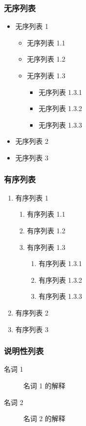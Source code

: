 \documentclass[
    10pt,
    pdf,
    UTF8,
    aspectratio=169
]{ctexbeamer}
\begin{document}
\begin{frame}
    \frametitle{无序列表}
    \begin{itemize}
        \item 无序列表 1
        \begin{itemize}
            \item 无序列表 1.1
            \item 无序列表 1.2
            \item 无序列表 1.3
            \begin{itemize}
                \item 无序列表 1.3.1
                \item 无序列表 1.3.2
                \item 无序列表 1.3.3
            \end{itemize}
        \end{itemize}
        \item 无序列表 2
        \item 无序列表 3
    \end{itemize}
\end{frame}
\begin{frame}
    \frametitle{有序列表}
    \begin{enumerate}
        \item 有序列表 1
        \begin{enumerate}
            \item 有序列表 1.1
            \item 有序列表 1.2
            \item 有序列表 1.3
            \begin{enumerate}
                \item 有序列表 1.3.1
                \item 有序列表 1.3.2
                \item 有序列表 1.3.3
            \end{enumerate}
        \end{enumerate}
        \item 有序列表 2
        \item 有序列表 3
    \end{enumerate}
\end{frame}
\begin{frame}
    \frametitle{说明性列表}
    \begin{description}
        \item[名词 1] 名词 1 的解释
        \item[名词 2] 名词 2 的解释
    \end{description}
\end{frame}
\end{document}
